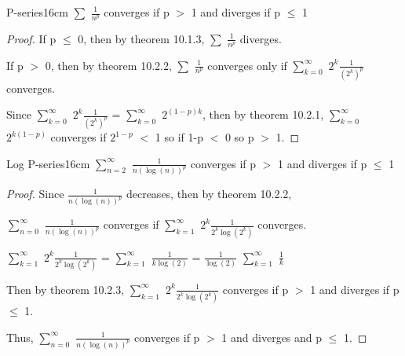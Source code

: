     \vspace{0.5cm}



    \begin{wtheorem}{P-series}{16cm}
        $\sum$ $\frac{1}{n^p}$ converges if p $>$ 1 and diverges if p $\leq$ 1
    \end{wtheorem}

    \begin{proof}
        If p $\leq$ 0, then by {\color{red} theorem 10.1.3},
        $\sum$ $\frac{1}{n^p}$ diverges.

        If p $>$ 0, then by {\color{red} theorem 10.2.2},
        $\sum$ $\frac{1}{n^p}$ converges only if
        $\sum_{k=0}^{\infty}$ $2^k \frac{1}{(2^k)^p}$ converges.

        Since $\sum_{k=0}^{\infty}$ $2^k \frac{1}{(2^k)^p}$
        = $\sum_{k=0}^{\infty}$ $2^{(1-p)k}$, then by {\color{red} theorem 10.2.1},
        $\sum_{k=0}^{\infty}$ $2^{k(1-p)}$ converges if
        $2^{1-p}$ $<$ 1 so if 1-p $<$ 0 so p $>$ 1.
    \end{proof}

    \newpage



    \begin{wtheorem}{Log P-series}{16cm}
        $\sum_{n = 2}^{\infty}$ $\frac{1}{n(\log(n))^p}$
        converges if p $>$ 1 and diverges if p $\leq$ 1    
    \end{wtheorem}
    
    \begin{proof}
        Since $\frac{1}{n(\log(n))^p}$ decreases, then by
        {\color{red} theorem 10.2.2},

        $\sum_{n=0}^{\infty}$ $\frac{1}{n(\log(n))^p}$ converges if
        $\sum_{k=1}^{\infty}$ $2^k \frac{1}{2^k \log(2^k)}$ converges.
        
        \hspace{1cm}
        $\sum_{k=1}^{\infty}$ $2^k \frac{1}{2^k \log(2^k)}$
        = $\sum_{k=1}^{\infty}$ $\frac{1}{ k \log(2)}$
        = $\frac{1}{\log(2)}$ $\sum_{k=1}^{\infty}$ $\frac{1}{k}$

        Then by {\color{red} theorem 10.2.3},
        $\sum_{k=1}^{\infty}$ $2^k \frac{1}{2^k \log(2^k)}$ converges if
        p $>$ 1 and diverges if p $\leq$ 1.

        Thus, $\sum_{n=0}^{\infty}$ $\frac{1}{n(\log(n))^p}$ converges if
        p $>$ 1 and diverges and p $\leq$ 1.
    \end{proof}

